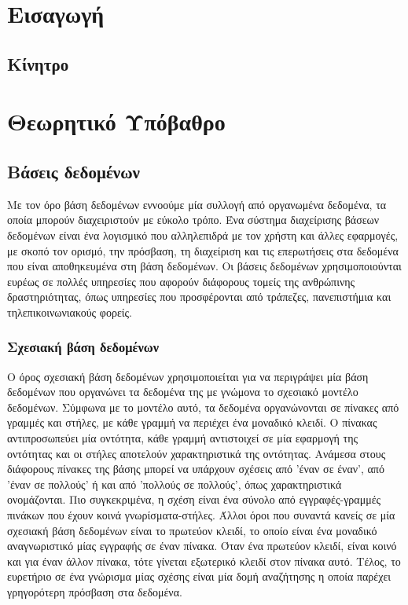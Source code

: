 \documentclass[diploma]{softlab-thesis}
\begin{document}

\tableofcontents


\mainmatter

\chapter{Εισαγωγή}

\section{Κίνητρο}


\chapter{Θεωρητικό Υπόβαθρο}

\section{Βάσεις δεδομένων}

Με τον όρο βάση δεδομένων εννοούμε μία συλλογή από οργανωμένα δεδομένα, τα οποία μπορούν διαχειριστούν με εύκολο τρόπο. Ένα σύστημα διαχείρισης βάσεων δεδομένων 
είναι ένα λογισμικό που αλληλεπιδρά με τον χρήστη και άλλες εφαρμογές, με σκοπό τον ορισμό, την πρόσβαση, τη διαχείριση και τις επερωτήσεις στα δεδομένα που είναι 
αποθηκευμένα στη βάση δεδομένων. Οι βάσεις δεδομένων χρησιμοποιούνται ευρέως σε πολλές υπηρεσίες που αφορούν διάφορους τομείς της ανθρώπινης δραστηριότητας, όπως 
υπηρεσίες που προσφέρονται από τράπεζες, πανεπιστήμια και τηλεπικοινωνιακούς φορείς.

\subsection{Σχεσιακή βάση δεδομένων}

Ο όρος σχεσιακή βάση δεδομένων χρησιμοποιείται για να περιγράψει μία βάση δεδομένων που οργανώνει τα δεδομένα της με γνώμονα το σχεσιακό μοντέλο δεδομένων. Σύμφωνα 
με το μοντέλο αυτό, τα δεδομένα οργανώνονται σε πίνακες από γραμμές και στήλες, με κάθε γραμμή να περιέχει ένα μοναδικό κλειδί. Ο πίνακας αντιπροσωπεύει μία οντότητα, 
κάθε γραμμή αντιστοιχεί σε μία εφαρμογή της οντότητας και οι στήλες αποτελούν χαρακτηριστικά της οντότητας. Ανάμεσα στους διάφορους πίνακες της βάσης μπορεί να υπάρχουν 
σχέσεις από 'έναν σε έναν', από 'έναν σε πολλούς' ή και από 'πολλούς σε πολλούς', όπως χαρακτηριστικά ονομάζονται. Πιο συγκεκριμένα, η σχέση είναι ένα σύνολο από 
εγγραφές-γραμμές πινάκων που έχουν κοινά γνωρίσματα-στήλες. Άλλοι όροι που συναντά κανείς σε μία σχεσιακή βάση δεδομένων είναι το πρωτεύον κλειδί, το οποίο είναι ένα 
μοναδικό αναγνωριστικό μίας εγγραφής σε έναν πίνακα. Όταν ένα πρωτεύον κλειδί, είναι κοινό και για έναν άλλον πίνακα, τότε γίνεται εξωτερικό κλειδί στον πίνακα αυτό. Τέλος, 
το ευρετήριο σε ένα γνώρισμα μίας σχέσης είναι μία δομή αναζήτησης η οποία παρέχει γρηγορότερη πρόσβαση στα δεδομένα.
\end{document}
